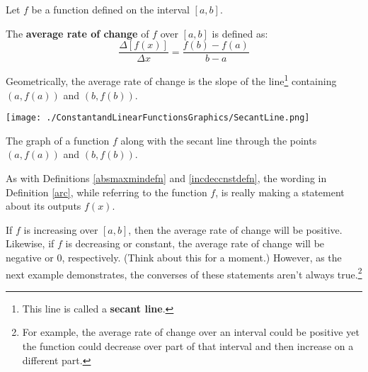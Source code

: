 \documentclass{ximera}
\begin{document}
\begin{definition} \label{arc}  Let $f$ be a function defined on the interval $[a,b]$. 

 The \textbf{average rate of change}  of $f$ over $[a,b]$ is defined as: \[ \dfrac{\Delta [f(x)]}{\Delta x} = \dfrac{f(b) - f(a)}{b-a} \]

Geometrically, the average rate of change is the slope of the line\footnote{This line is called a \textbf{secant line}.}  containing $(a, f(a))$ and $(b, f(b))$.

\end{definition}





\begin{center}
\texttt{[image: ./ConstantandLinearFunctionsGraphics/SecantLine.png]}

The graph of a function $f$ along with the secant line through the points $(a, f(a))$ and $(b, f(b))$.

\end{center}

As with Definitions \ref{absmaxmindefn}  and \ref{incdeccnstdefn}, the wording in Definition \ref{arc}, while referring to the function $f$, is really making a statement about its outputs $f(x)$.  



If $f$ is increasing over $[a,b]$, then the average rate of change will be positive. Likewise, if $f$ is decreasing or constant, the average rate of change will be negative or $0$, respectively. (Think about this for a moment.) However, as the next example demonstrates, the converses of these statements aren't always true.\footnote{For example, the average rate of change over an interval could be positive yet the function could decrease over part of that interval and then increase on a different part.}
\end{document}
